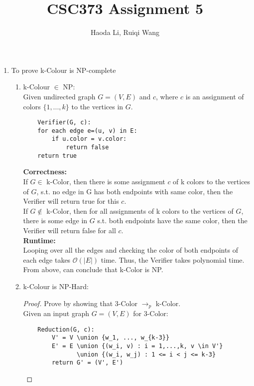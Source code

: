 \documentclass[11pt]{article}
\title{CSC373 Assignment 5}
\author{Haoda Li, Ruiqi Wang}
\begin{document}
\maketitle
\begin{enumerate}
    \item To prove k-Colour is NP-complete
    \begin{enumerate}
        \item k-Colour $\in$ NP:\\
            Given undirected graph $G=(V,E)$ and $c$, where $c$ is an assignment of colors $\{1,...,k\}$ to the vertices in $G$.\\
        
            \begin{lstlisting}
    Verifier(G, c):
    for each edge e=(u, v) in E:
        if u.color = v.color:
            return false
    return true
            \end{lstlisting}
    
        \textbf{Correctness: }\\
        If $G \in$ k-Color, then there is some assignment $c$ of k colors to the vertices of $G$, s.t. no edge in G has both endpoints with same color, then the Verifier will return true for this $c$.\\
        If $G \notin$ k-Color, then for all assignments of k colors to the vertices of $G$, there is some edge in $G$ s.t. both endpoints have the same color, then the Verifier will return false for all $c$.\\[2ex] 
        \textbf{Runtime: }\\
        Looping over all the edges and checking the color of both endpoints of each edge takes $\mathcal{O}(|E|)$ time. Thus, the Verifier takes polynomial time.\\[2ex]
        From above, can conclude that k-Color is NP.\\
        
        
        \item k-Colour is NP-Hard:
        \begin{proof}
            Prove by showing that 3-Color $\rightarrow_p$ k-Color.\\
            Given an input graph $G = (V, E)$ for 3-Color:\\
            \begin{lstlisting}
    Reduction(G, c):
        V' = V \union {w_1, ..., w_{k-3}}
        E' = E \union {(w_i, v) : i = 1,...,k, v \in V'}
               \union {(w_i, w_j) : 1 <= i < j <= k-3}
        return G' = (V', E')
            \end{lstlisting}
            

\end{proof}
\end{enumerate}
\end{enumerate}
\end{document}

